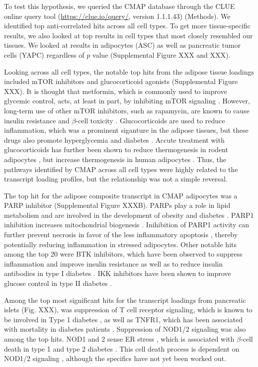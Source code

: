 \documentclass[
]{article}
\begin{document}
To test this hypothesis, we queried the CMAP database through the CLUE
online query tool (\url{https://clue.io/query/}, version 1.1.1.43)
(Methods). We identified top anti-correlated hits across all cell types.
To get more tissue-specific results, we also looked at top results in
cell types that most closely resembled our tissues. We looked at results
in adipocytes (ASC) as well as pancreatic tumor cells (YAPC) regardless
of \(p\) value (Supplemental Figure XXX and XXX).

Looking across all cell types, the notable top hits from the adipose
tissue loadings included mTOR inhibitors and glucocorticoid agonists
(Supplemental Figure XXX). It is thought that metformin, which is
commonly used to improve glycemic control, acts, at least in part, by
inhibiting mTOR signaling \cite{pmid30290005, 
pmid30034573}. However, long-term use of other mTOR inhibitors, such as
rapamycin, are known to cause insulin resistance and \(\beta\)-cell
toxicity \cite{pmid30034573, pmid23881200, pmid21266327}.
Glucocorticoids are used to reduce inflammation, which was a prominent
siganture in the adipose tissues, but these drugs also promote
hyperglycemia and diabetes \cite{pmid24582093, pmid35585199}. Accute
treatment with glucocorticoids has further been shown to reduce
thermogenesis in rodent adipocytes \cite{pmid30310815, 
pmid11254472, pmid23197361}, but increase thermogenesis in human
adipocytes \cite{pmid27411014, pmid25385872}. Thus, the pathways
identified by CMAP across all cell types were highly related to the
transcript loading profiles, but the relationship was not a simple
reversal.

The top hit for the adipose composite transcript in CMAP adipocytes was
a PARP inhibitor (Supplemental Figure XXXB). PARPs play a role in lipid
metabolism and are involved in the development of obesity and diabetes
\cite{pmid34450194}. PARP1 inhibition increases mitochondrial biogenesis
\cite{pmid21459330}. Inihibition of PARP1 activity can further prevent
necrosis in favor of the less inflammatory apoptosis
\cite{pmid12114611}, thereby potentially reducing inflammation in
stressed adipocytes. Other notable hits among the top 20 were BTK
inhibitors, which have been observed to suppress inflammation and
improve insulin resistance \cite{pmid33648925} as well as to reduce
insulin antibodies in type I diabetes \cite{pmid28753229}. IKK
inhibitors have been shown to improve glucose control in type II
diabetes \cite{pmid28683283, pmid15685170}.

Among the top most significant hits for the transcript loadings from
pancreatic islets (Fig. XXX), was suppression of T cell receptor
signaling, which is known to be involved in Type 1 diabetes
\cite{pmid33603744}, as well as TNFR1, which has been associated with
mortality in diabetes patients \cite{pmid32281000}. Suppression of
NOD1/2 signaling was also among the top hits. NOD1 and 2 sense ER stress
\cite{pmid27007849, pmid28823510}, which is associated with
\(\beta\)-cell death in type 1 and type 2 diabetes \cite{pmid24520198}.
This cell death process is dependent on NOD1/2 signaling
\cite{pmid27007849}, although the specifics have not yet been worked
out.
\end{document}
